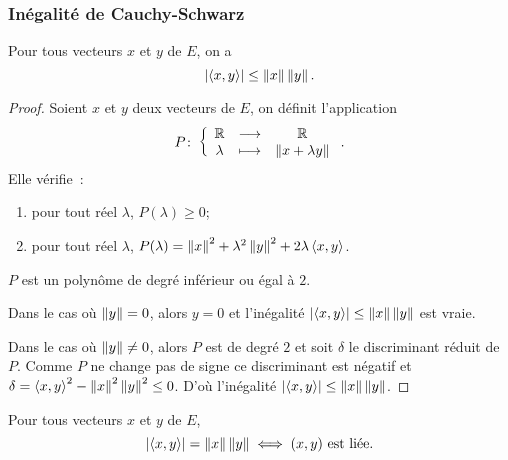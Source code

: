 \subsubsection{Inégalité de Cauchy-Schwarz}

\begin{theo}
  Pour tous vecteurs $x$ et $y$ de $E$, on a
  \begin{equation}
    \left\lvert\left\langle{x},{y}\right\rangle\right\rvert \leq \left\lVert x\right\rVert\left\lVert y\right\rVert.
  \end{equation}
\end{theo}
\begin{proof}
  Soient $x$ et $y$ deux vecteurs de $E$, on définit l'application
  \begin{equation}
    P\colon \left\{\begin{array}{ccc} \mathbb{R} & \longrightarrow &\mathbb{R}\\ \lambda & \longmapsto & \left\lVert x+\lambda y\right\rVert \end{array} \right..
  \end{equation}
  Elle vérifie~:
  \begin{enumerate}
  \item pour tout réel $\lambda$, $P(\lambda)\geq 0$;
  \item pour tout réel $\lambda$, $P(\lambda) = \left\lVert x\right\rVert^2+\lambda^2\left\lVert y\right\rVert^2+2\lambda\left\langle{x},{y}\right\rangle$.
  \end{enumerate}
  $P$ est un polynôme de degré inférieur ou égal à $2$. 

  Dans le cas où $\left\lVert y\right\rVert=0$, alors $y=0$ et l'inégalité $\left\lvert\left\langle{x},{y}\right\rangle\right\rvert \leq \left\lVert x\right\rVert\left\lVert y\right\rVert$ est vraie.

  Dans le cas où $\left\lVert y\right\rVert\neq 0$, alors $P$ est de degré $2$ et soit $\delta$ le discriminant réduit de $P$. Comme $P$ ne change pas de signe ce discriminant est négatif et $\delta=\left\langle{x},{y}\right\rangle^2-\left\lVert x\right\rVert^2\left\lVert y\right\rVert^2\leq 0$. D'où l'inégalité $\left\lvert\left\langle{x},{y}\right\rangle\right\rvert \leq \left\lVert x\right\rVert\left\lVert y\right\rVert$.
\end{proof}
%
\begin{prop}
  Pour tous vecteurs $x$ et $y$ de $E$,
  \begin{equation}
    \left\lvert\left\langle{x},{y}\right\rangle\right\rvert=\left\lVert x\right\rVert\left\lVert y\right\rVert \iff (x,y) \text{~est liée}.
  \end{equation}
\end{prop}
